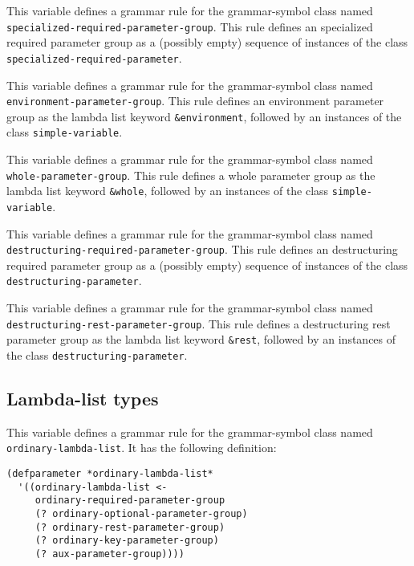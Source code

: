 
This variable defines a grammar rule for the grammar-symbol class
named \texttt{specialized-required-parameter-group}.  This rule
defines an specialized required parameter group as a (possibly empty)
sequence of instances of the class
\texttt{specialized-required-parameter}.


This variable defines a grammar rule for the grammar-symbol class
named \texttt{environment-parameter-group}.  This rule defines an
environment parameter group as the lambda list keyword
\texttt{\&environment}, followed by an instances of the class
\texttt{simple-variable}.


This variable defines a grammar rule for the grammar-symbol class
named \texttt{whole-parameter-group}.  This rule defines a whole
parameter group as the lambda list keyword \texttt{\&whole}, followed
by an instances of the class \texttt{simple-variable}.


This variable defines a grammar rule for the grammar-symbol class
named \texttt{destructuring-required-parameter-group}.  This rule
defines an destructuring required parameter group as a (possibly
empty) sequence of instances of the class
\texttt{destructuring-parameter}.


This variable defines a grammar rule for the grammar-symbol class
named \texttt{destructuring-rest-parameter-group}.  This rule defines
a destructuring rest parameter group as the lambda list keyword
\texttt{\&rest}, followed by an instances of the class
\texttt{destructuring-parameter}.

\subsection{Lambda-list types}


This variable defines a grammar rule for the grammar-symbol class
named \texttt{ordinary-lambda-list}.  It has the following definition:

\begin{verbatim}
(defparameter *ordinary-lambda-list*
  '((ordinary-lambda-list <-
     ordinary-required-parameter-group
     (? ordinary-optional-parameter-group)
     (? ordinary-rest-parameter-group)
     (? ordinary-key-parameter-group)
     (? aux-parameter-group))))
\end{verbatim}

